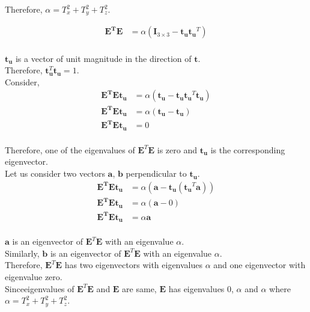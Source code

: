 \documentclass[11pt]{article}
\begin{document}
\begin{enumerate}
\begin{enumerate}
Therefore, $\alpha = T_{x}^2 + T_{y}^2 + T_{z}^2$.

\begin{align*}
\mathbf{E^TE} &= \alpha(\mathbf{I}_{3\times3} - \mathbf{t_ut_u}^T)\\
\end{align*}

$\textbf{t}_\textbf{u}$ is a vector of unit magnitude in the direction of $\textbf{t}$. \\
Therefore, $\textbf{t}_\textbf{u}^T\textbf{t}_\textbf{u} = 1 $. \\

Consider,
\begin{align*}
\mathbf{E^TEt_u} &= \alpha(\mathbf{t_u} - \mathbf{t_ut_u}^T\mathbf{t_u})\\
\mathbf{E^TEt_u} &= \alpha(\mathbf{t_u} - \mathbf{t_u})\\
\mathbf{E^TEt_u} &= 0\\
\end{align*}

Therefore, one of the eigenvalues of $\textbf{E}^T \textbf{E}$ is zero and $\textbf{t}_\textbf{u}$ is the corresponding eigenvector. \\
Let us consider two vectors $\textbf{a}$, $\textbf{b}$ perpendicular to $\textbf{t}_\textbf{u}$. \\

\begin{align*}
\mathbf{E^TEt_u} &= \alpha(\mathbf{a} - \mathbf{t_u}(\mathbf{t_u}^T\mathbf{a}))\\
\mathbf{E^TEt_u} &= \alpha(\mathbf{a} - 0)\\
\mathbf{E^TEt_u} &= \alpha\mathbf{a}\\
\end{align*}

$\textbf{a}$ is an eigenvector of $\textbf{E}^T \textbf{E}$ with an eigenvalue $\alpha$.\\
Similarly, $\textbf{b}$ is an eigenvector of $\textbf{E}^T \textbf{E}$ with an eigenvalue $\alpha$.\\

Therefore, $\textbf{E}^T \textbf{E}$ has two eigenvectors with eigenvalues $\alpha$ and one eigenvector with eigenvalue zero. \\Sinceeigenvalues of $\textbf{E}^T \textbf{E}$ and $\textbf{E}$ are same, $\textbf{E}$ has eigenvalues 0, $\alpha$ and $\alpha$ where $\alpha = T_{x}^2 + T_{y}^2 + T_{z}^2$.\\




\end{enumerate}
\end{enumerate}
\end{document}
